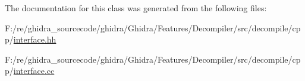 The documentation for this class was generated from the following files\+:\begin{DoxyCompactItemize}
\item 
F\+:/re/ghidra\+\_\+sourcecode/ghidra/\+Ghidra/\+Features/\+Decompiler/src/decompile/cpp/\mbox{\hyperlink{interface_8hh}{interface.\+hh}}\item 
F\+:/re/ghidra\+\_\+sourcecode/ghidra/\+Ghidra/\+Features/\+Decompiler/src/decompile/cpp/\mbox{\hyperlink{interface_8cc}{interface.\+cc}}\end{DoxyCompactItemize}
